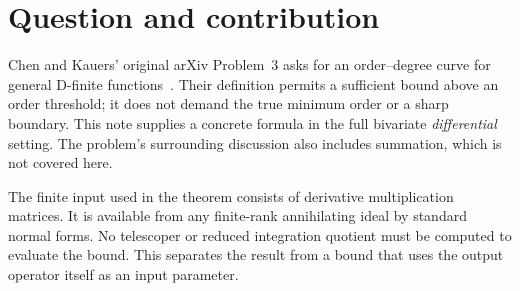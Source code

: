 \maketitle
\begin{abstract}
For a bivariate differential D-finite input presented by rank-$m$ rational
connection matrices $A/D$ and $B/D$, we give an explicit sufficient
order--degree curve using only the maximum bidegrees $(t,s)$ of $A,B,D$.
For every integer $r\ge m(s+1)$, a telescoper of exact order $r$ exists with
degree at most
\[
 \left\lfloor\frac{mt[(2r-1)s+r]}{r+1-m(s+1)}\right\rfloor.
\]
A polynomial certificate support bound and an integer coefficient bound
are obtained simultaneously. The argument counts polynomial unknowns
in the generalized Apagodu--Zeilberger ansatz and controls the
certificate-only kernel by evaluation at an ordinary point. It imposes
no Fuchsian or regular-singularity assumption. The result addresses
the differential setting of Chen--Kauers Problem~3; it does not establish
a first resolution, a new foundational principle, or an extension to
arbitrary discrete and mixed Ore systems. Seven exact ansatz computations
and three special-function certificate identities accompany the proof.
Their verification scripts are embedded in the single TeX source.
\end{abstract}

\section{Question and contribution}
Chen and Kauers' original arXiv Problem~3 asks for an order--degree curve
for general D-finite functions~\cite{CK2016}. Their definition permits
a sufficient bound above an order threshold; it does not demand the
true minimum order or a sharp boundary. This note supplies a concrete
formula in the full bivariate \emph{differential} setting. The problem's
surrounding discussion also includes summation, which is not covered here.

The finite input used in the theorem consists of derivative multiplication
matrices. It is available from any finite-rank annihilating ideal by
standard normal forms. No telescoper or reduced integration quotient
must be computed to evaluate the bound. This separates the result from
a bound that uses the output operator itself as an input parameter.

